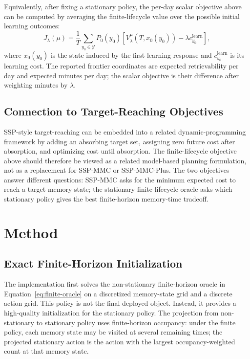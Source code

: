 \documentclass[11pt]{article}
\begin{document}
Equivalently, after fixing a stationary policy, the per-day scalar objective above can be computed by averaging the finite-lifecycle value over the possible initial learning outcomes:
\[
J_\lambda(\mu)
=
\frac{1}{T}
\sum_{y_0\in\mathcal{Y}} P_0(y_0)
\left[
V_\lambda^\mu(T,x_0(y_0))
-\lambda c^{\mathrm{learn}}_{y_0}
\right],
\]
where \(x_0(y_0)\) is the state induced by the first learning response and \(c^{\mathrm{learn}}_{y_0}\) is its learning cost. The reported frontier coordinates are expected retrievability per day and expected minutes per day; the scalar objective is their difference after weighting minutes by \(\lambda\).

\subsection{Connection to Target-Reaching Objectives}

SSP-style target-reaching can be embedded into a related dynamic-programming framework by adding an absorbing target set, assigning zero future cost after absorption, and optimizing cost until absorption. The finite-lifecycle objective above should therefore be viewed as a related model-based planning formulation, not as a replacement for SSP-MMC or SSP-MMC-Plus. The two objectives answer different questions: SSP-MMC asks for the minimum expected cost to reach a target memory state; the stationary finite-lifecycle oracle asks which stationary policy gives the best finite-horizon memory-time tradeoff.

\section{Method}

\subsection{Exact Finite-Horizon Initialization}

The implementation first solves the non-stationary finite-horizon oracle in Equation~\eqref{eq:finite-oracle} on a discretized memory-state grid and a discrete action grid. This policy is not the final deployed object. Instead, it provides a high-quality initialization for the stationary policy. The projection from non-stationary to stationary policy uses finite-horizon occupancy: under the finite policy, each memory state may be visited at several remaining times; the projected stationary action is the action with the largest occupancy-weighted count at that memory state.
\end{document}
